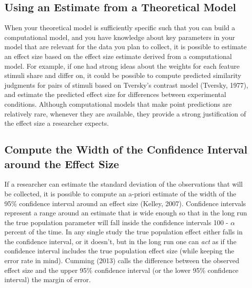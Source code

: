 \documentclass[
  english,
  ,jou, a4paper,floatsintext]{apa6}
\begin{document}
\hypertarget{using-an-estimate-from-a-theoretical-model}{%
\subsection{Using an Estimate from a Theoretical Model}\label{using-an-estimate-from-a-theoretical-model}}

When your theoretical model is sufficiently specific such that you can build a computational model, and you have knowledge about key parameters in your model that are relevant for the data you plan to collect, it is possible to estimate an effect size based on the effect size estimate derived from a computational model. For example, if one had strong ideas about the weights for each feature stimuli share and differ on, it could be possible to compute predicted similarity judgments for pairs of stimuli based on Tversky's contrast model (Tversky, 1977), and estimate the predicted effect size for differences between experimental conditions. Although computational models that make point predictions are relatively rare, whenever they are available, they provide a strong justification of the effect size a researcher expects.

\hypertarget{compute-the-width-of-the-confidence-interval-around-the-effect-size}{%
\subsection{Compute the Width of the Confidence Interval around the Effect Size}\label{compute-the-width-of-the-confidence-interval-around-the-effect-size}}

If a researcher can estimate the standard deviation of the observations that will be collected, it is possible to compute an a-priori estimate of the width of the 95\% confidence interval around an effect size (Kelley, 2007). Confidence intervals represent a range around an estimate that is wide enough so that in the long run the true population parameter will fall inside the confidence intervals 100 - \(\alpha\) percent of the time. In any single study the true population effect either falls in the confidence interval, or it doesn't, but in the long run one can \emph{act} as if the confidence interval includes the true population effect size (while keeping the error rate in mind). Cumming (2013) calls the difference between the observed effect size and the upper 95\% confidence interval (or the lower 95\% confidence interval) the margin of error.
\end{document}
